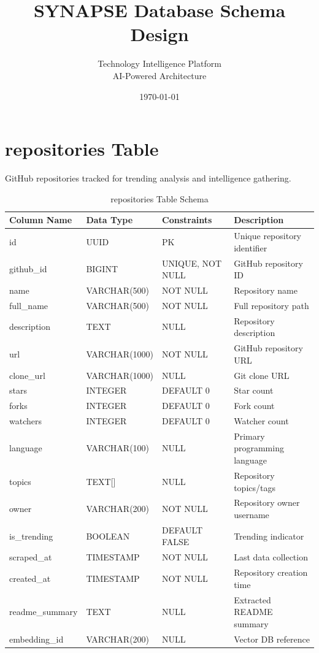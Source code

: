 \documentclass[12pt,a4paper]{report}
\title{\textbf{\Large SYNAPSE Database Schema Design}}
\author{Technology Intelligence Platform\\AI-Powered Architecture}
\date{\today}
\begin{document}
\maketitle

\tableofcontents
\newpage

\section{repositories Table}

GitHub repositories tracked for trending analysis and intelligence gathering.

\begin{table}[h]
\centering
\small
\caption{repositories Table Schema}
\begin{tabular}{|l|l|l|l|}
\toprule
\textbf{Column Name} & \textbf{Data Type} & \textbf{Constraints} & \textbf{Description} \\
\midrule
id & UUID & PK & Unique repository identifier \\
github\_id & BIGINT & UNIQUE, NOT NULL & GitHub repository ID \\
name & VARCHAR(500) & NOT NULL & Repository name \\
full\_name & VARCHAR(500) & NOT NULL & Full repository path \\
description & TEXT & NULL & Repository description \\
url & VARCHAR(1000) & NOT NULL & GitHub repository URL \\
clone\_url & VARCHAR(1000) & NULL & Git clone URL \\
stars & INTEGER & DEFAULT 0 & Star count \\
forks & INTEGER & DEFAULT 0 & Fork count \\
watchers & INTEGER & DEFAULT 0 & Watcher count \\
language & VARCHAR(100) & NULL & Primary programming language \\
topics & TEXT[] & NULL & Repository topics/tags \\
owner & VARCHAR(200) & NOT NULL & Repository owner username \\
is\_trending & BOOLEAN & DEFAULT FALSE & Trending indicator \\
scraped\_at & TIMESTAMP & NOT NULL & Last data collection \\
created\_at & TIMESTAMP & NOT NULL & Repository creation time \\
readme\_summary & TEXT & NULL & Extracted README summary \\
embedding\_id & VARCHAR(200) & NULL & Vector DB reference \\
\bottomrule
\end{tabular}
\end{table}
\end{document}
